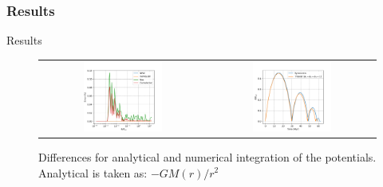 \documentclass{beamer}
\begin{document}
\subsubsection{Results}
\begin{frame}{Results}
	\begin{figure}[h]
		\centering
		\begin{tabular}{cc}
			\includegraphics[width = 0.49\textwidth]{"../Files/Week 7/error"} & 
			\includegraphics[width = 0.49\textwidth]{"../Files/Week 7/symmetric_triaxial"}
		\end{tabular}
		\caption{Differences for analytical and numerical integration of the potentials. Analytical is taken as: $-GM(r) / r^2$}
		\label{fig: numericalErrors}
	\end{figure}
\end{frame}
\end{document}
